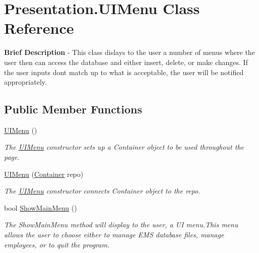 \hypertarget{class_presentation_1_1_u_i_menu}{}\section{Presentation.\+U\+I\+Menu Class Reference}
\label{class_presentation_1_1_u_i_menu}


{\bfseries Brief Description} -\/ This class dislays to the user a number of menus where the user then can access the database and either insert, delete, or make changes. If the user inputs don\textquotesingle{}t match up to what is acceptable, the user will be notified appropriately.  


\subsection*{Public Member Functions}
\begin{DoxyCompactItemize}
\item 
\hyperlink{class_presentation_1_1_u_i_menu_aecce7fd9ed4696929cbcada2da8c4c2c}{U\+I\+Menu} ()
\begin{DoxyCompactList}\small\item\em The \hyperlink{class_presentation_1_1_u_i_menu}{U\+I\+Menu} constructor sets up a Container object to be used throughout the page. \end{DoxyCompactList}\item 
\hyperlink{class_presentation_1_1_u_i_menu_ac27724c06cbdcddbcf940f812ba307e3}{U\+I\+Menu} (\hyperlink{class_the_company_1_1_container}{Container} repo)
\begin{DoxyCompactList}\small\item\em The \hyperlink{class_presentation_1_1_u_i_menu}{U\+I\+Menu} constructor connects Container object to the repo. \end{DoxyCompactList}\item 
bool \hyperlink{class_presentation_1_1_u_i_menu_aa358c475a580c724b992458425649ada}{Show\+Main\+Menu} ()
\begin{DoxyCompactList}\small\item\em The Show\+Main\+Menu method will display to the user, a U\+I menu.\+This menu allows the user to choose either to manage E\+M\+S database files, manage employees, or to quit the program. \end{DoxyCompactList}\end{DoxyCompactItemize}
